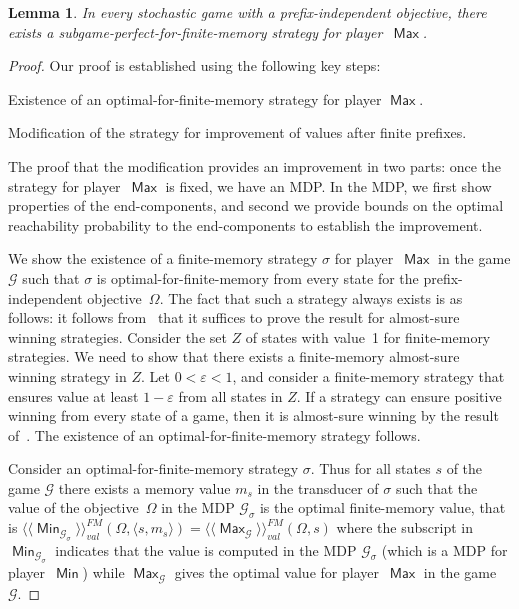 \documentclass{article}
\newtheorem{lemma}{Lemma}
\newcommand{\tuple}[1]{\langle #1 \rangle}
\let\epsilon\varepsilon
\newcommand{\GG}{\mathcal{G}}
\newcommand{\winval}[1]{\langle \! \langle #1 \rangle\! \rangle_{\mathit{val}} }
\newcommand{\winvalf}[1]{\winval{#1}^{{FM}}}
\newcommand{\straa}{\sigma}
\DeclareMathOperator{\ma}{\mathsf{Max}}
\DeclareMathOperator{\mi}{\mathsf{Min}}
\begin{document}
\begin{lemma} \label{lem:subgame-perfect}
In every stochastic game with a prefix-independent objective, there exists a 
subgame-perfect-for-finite-memory strategy for player~$\ma$.
\end{lemma}
\begin{proof}
Our proof is established using the following key steps:
\begin{compactenum}
\item Existence of an optimal-for-finite-memory strategy for player $\ma$.

\item Modification of the strategy for improvement of values after
finite prefixes.

\item The proof that the modification provides an 
improvement in two parts: 
once the strategy for player~$\ma$ is fixed, we have an MDP. 
In the MDP, we first show properties of the end-components, and 
second we provide bounds on the optimal reachability probability to 
the end-components to establish the improvement.

\end{compactenum}

\smallskip{}
We show the existence of a finite-memory strategy $\straa$ for player~$\ma$ 
in the game $\GG$ such that $\straa$ is optimal-for-finite-memory from every 
state for the prefix-independent objective~$\Omega$.
The fact that such a strategy always exists is as follows: 
it follows from~\cite[Theorem~4.3]{GH10} that it suffices to prove the result 
for almost-sure winning strategies.
Consider the set $Z$ of states with value~1 for finite-memory strategies. 
We need to show that there exists a finite-memory almost-sure winning strategy
in $Z$.
Let $0 < \epsilon < 1$, and consider a finite-memory strategy that ensures 
value at least $1-\epsilon$ from all states in $Z$. 
If a strategy can ensure positive winning from every state of a game, 
then it is almost-sure winning by the result of~\cite{Cha07b}.
The existence of an optimal-for-finite-memory strategy follows.

\smallskip{}
Consider an optimal-for-finite-memory strategy $\straa$.
Thus for all states $s$ of the game $\GG$ there
exists a memory value $m_s$ in the transducer of $\straa$ such that the value
of the objective~$\Omega$ in the MDP $\GG_{\straa}$ is the optimal finite-memory value, 
that is $\winvalf{\mi_{\GG_{\straa}}}(\Omega, \tuple{s,m_s}) = \winvalf{\ma_{\GG}}(\Omega, s)$
where the subscript in $\mi_{\GG_{\straa}}$ indicates that 
the value is computed in the MDP $\GG_{\straa}$ (which is a MDP for player~$\mi$)
while $\ma_{\GG}$ gives the optimal value for player~$\ma$ in the game~$\GG$. 



\end{proof}
\end{document}
